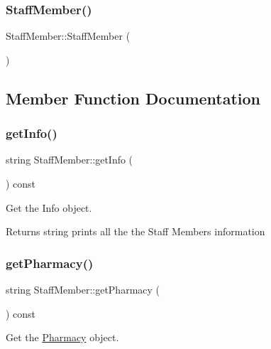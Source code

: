 \subsubsection{\texorpdfstring{Staff\+Member()}{StaffMember()}\hspace{0.1cm}{\footnotesize\ttfamily [2/2]}}
{\footnotesize\ttfamily Staff\+Member\+::\+Staff\+Member (\begin{DoxyParamCaption}{ }\end{DoxyParamCaption})}



\subsection{Member Function Documentation}
\mbox{\label{classStaffMember_ad9db2f7dc662950ea2e7e420285e5ea5}} 
\subsubsection{\texorpdfstring{get\+Info()}{getInfo()}}
{\footnotesize\ttfamily string Staff\+Member\+::get\+Info (\begin{DoxyParamCaption}{ }\end{DoxyParamCaption}) const}



Get the Info object. 

\begin{DoxyReturn}{Returns}
string prints all the the Staff Member\textquotesingle{}s information 
\end{DoxyReturn}
\mbox{\label{classStaffMember_a94c742e2577c13695fef27af507e153b}} 
\subsubsection{\texorpdfstring{get\+Pharmacy()}{getPharmacy()}}
{\footnotesize\ttfamily string Staff\+Member\+::get\+Pharmacy (\begin{DoxyParamCaption}{ }\end{DoxyParamCaption}) const}



Get the \hyperlink{classPharmacy}{Pharmacy} object. 

